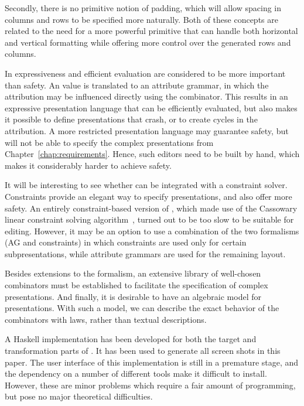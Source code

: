 \bc Secondly, there is no primitive notion of padding, which will allow spacing in columns and rows to be specified more naturally. Both of these concepts are related to the need for a more powerful  primitive that can handle both horizontal and vertical formatting while offering more control over the generated rows and columns. 
\ec

In {\Xprez}  expressiveness and efficient evaluation are considered to be more important than safety. An {\Xprez} value is translated to an attribute grammar, in which the attribution may be influenced directly using the   combinator. This results in an expressive presentation language that can be efficiently evaluated, but also makes it possible to define presentations that crash, or to create cycles in the attribution.  A more restricted presentation language may guarantee safety, but will not be able to specify the complex presentations from Chapter~\ref{chap:requirements}. Hence, such editors need to be built by hand, which makes it considerably harder to achieve safety.


It will be interesting to see whether {\Xprez} can be integrated with a constraint solver. Constraints provide an elegant way to specify presentations, and also offer more safety. An entirely constraint-based version of {\Xprez}, which made use of the Cassowary linear constraint solving algorithm~\cite{badros01cassowary}, turned out to be too slow to be suitable for editing. However, it may be an option to use  a combination of the two formalisms (AG and constraints) in which constraints are used only for certain subpresentations, while attribute grammars are used for the remaining layout.

Besides extensions to the {\Xprez} formalism, an extensive library of well-chosen combinators must be established to facilitate the specification of complex presentations. And finally, it is desirable to have an algebraic model for {\Xprez} presentations. With such a model, we can describe the  exact behavior of the combinators with laws, rather than textual descriptions.



\bc
A Haskell implementation has been developed for both the target and transformation parts of {\Xprez}. It has been used to generate all screen shots in this paper. The user interface of this implementation is still in a premature stage, and the dependency on a number of different tools make it difficult to install. However, these are minor problems which require a fair amount of programming, but pose no major theoretical difficulties. 
\ec

